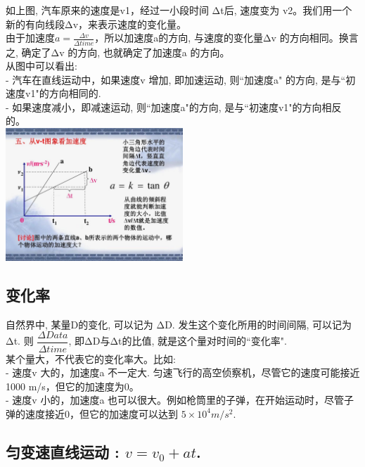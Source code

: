 \documentclass[UTF8]{ctexart}
\begin{document}
如上图, 汽车原来的速度是v1，经过一小段时间 Δt后, 速度变为 v2。我们用一个新的有向线段Δv，来表示速度的变化量。 \\
由于加速度$a=\frac{\varDelta v}{\varDelta time}$，所以加速度a的方向, 与速度的变化量Δv 的方向相同。换言之, 确定了Δv 的方向, 也就确定了加速度a 的方向。\\

从图中可以看出:  \\
- 汽车在直线运动中，如果速度v 增加, 即加速运动, 则``加速度a" 的方向, 是与``初速度v1"的方向相同的. \\
- 如果速度减小，即减速运动, 则``加速度a"的方向, 是与``初速度v1"的方向相反的。\\

\includegraphics[width=0.5\textwidth]{img/0108.jpg}

	
	\vspace{1em} 
	
\subsection{变化率}

自然界中, 某量D的变化, 可以记为 ΔD. 发生这个变化所用的时间间隔, 可以记为Δt. 则 $\dfrac{\varDelta Data}{\varDelta time}$, 即ΔD与Δt的比值, 就是这个量对时间的``变化率".\\

某个量大，不代表它的变化率大。比如: \\
- 速度v 大的，加速度a 不一定大. 匀速飞行的高空侦察机，尽管它的速度可能接近 1000 m/s，但它的加速度为0。\\
- 速度v 小的，加速度a 也可以很大。例如枪筒里的子弹，在开始运动时，尽管子弹的速度接近0，但它的加速度可以达到 $5×10^4 m/s^2$.\\

\vspace{1em} 


\subsection{匀变速直线运动 : $v = v_0 + at$.}	
\end{document}
